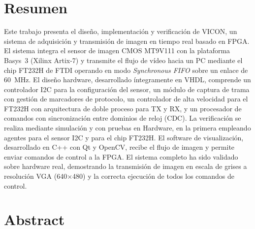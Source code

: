 





\chapter*{Resumen} %

Este trabajo presenta el diseño, implementación y verificación de VICON, un sistema de adquisición y transmisión de imagen en tiempo 
real basado en FPGA. El sistema integra el sensor de imagen CMOS MT9V111 con la plataforma Basys~3 (Xilinx Artix-7) y transmite el flujo de vídeo hacia un PC mediante 
el chip FT232H de FTDI operando en modo \textit{Synchronous FIFO} sobre un enlace de 60~MHz.
El diseño hardware, desarrollado íntegramente en VHDL, comprende un controlador I2C para la configuración del sensor, un módulo de captura de trama con gestión 
de marcadores de protocolo, un controlador de alta velocidad para el FT232H con arquitectura de doble proceso para TX y RX, y un procesador de comandos con 
sincronización entre dominios de reloj (CDC). La verificación se realiza mediante simulación y con pruebas en Hardware, 
en la primera empleando agentes para el sensor I2C y para el chip FT232H. El software de visualización, desarrollado en C++ con Qt y OpenCV, recibe el flujo de imagen y permite enviar comandos de control a la FPGA.
El sistema completo ha sido validado sobre hardware real, demostrando la transmisión de imagen en escala de grises a resolución VGA (640$\times$480) y la correcta ejecución de todos los comandos de control.


\newpage
\thispagestyle{empty}
\mbox{}
\newpage


\chapter*{Abstract} %

